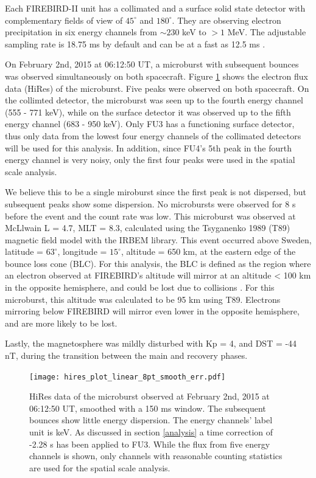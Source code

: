 \documentclass[draft,linenumbers]{agujournal}
\begin{document}
Each FIREBIRD-II unit has a collimated and a surface solid state detector with complementary fields of view of $45^{\circ}$ and $180^{\circ}$. They are observing electron precipitation in six energy channels from $\sim 230$ keV to $> 1$ MeV. The adjustable sampling rate is 18.75 ms by default and can be at a fast as 12.5 ms \citep{Crew16}. 

On February 2nd, 2015 at 06:12:50 UT, a microburst with subsequent bounces was observed simultaneously on both spacecraft. Figure \ref{hires_plot} shows the electron flux data (HiRes) of the microburst. Five peaks were observed on both spacecraft. On the collimted detector, the microburst was seen up to the fourth energy channel (555 - 771 keV), while on the surface detector it was observed up to the fifth energy channel (683 - 950 keV). Only FU3 has a functioning surface detector, thus only data from the lowest four energy channels of the collimated detectors will be used for this analysis. In addition, since FU4's 5th peak in the fourth energy channel is very noisy, only the first four peaks were used in the spatial scale analysis.

We believe this to be a single miroburst since the first peak is not dispersed, but subsequent peaks show some dispersion. No microbursts were observed for 8 s before the event and the count rate was low. This microburst was observed at McLlwain L = 4.7, MLT = 8.3, calculated using the Tsyganenko 1989 (T89) magnetic field model \citep{Tsyganenko89} with the IRBEM library. This event occurred above Sweden, latitude = $63^{\circ}$, longitude = $15^{\circ}$, altitude = 650 km, at the eastern edge of the bounce loss cone (BLC). For this analysis, the BLC is defined as the region where an electron observed at FIREBIRD's altitude will mirror at an altitude < 100 km in the opposite hemisphere, and could be lost due to collisions \citep{Abel1998_1}. For this microburst, this altitude was calculated to be 95 km using T89. Electrons mirroring below FIREBIRD will mirror even lower in the opposite hemisphere, and are more likely to be lost. 

Lastly, the magnetosphere was mildly disturbed with Kp = 4, and DST = -44 nT, during the transition between the main and recovery phases.

\begin{figure}
\texttt{[image: hires\_plot\_linear\_8pt\_smooth\_err.pdf]}
\caption{HiRes data of the microburst observed at February 2nd, 2015 at 06:12:50 UT, smoothed with a 150 ms window. The subsequent bounces show little energy dispersion. The energy channels' label unit is keV. As discussed in section \ref{analysis} a time correction of -2.28 s has been applied to FU3. While the flux from five energy channels is shown, only channels with reasonable counting statistics are used for the spatial scale analysis.}
\label{hires_plot}
\end{figure}
\end{document}
